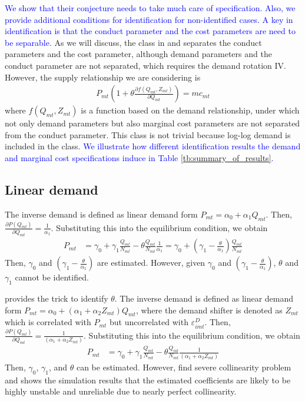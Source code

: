 \documentclass[11pt]{article}
\begin{document}
\textcolor{blue}{We show that their conjecture needs to take much care of specification. Also, we provide additional conditions for identification for non-identified cases.
A key in identification is that the conduct parameter and the cost parameters are need to be separable.}
As we will discuss, the class in \citet{bresnahan1982oligopoly} and \citet{lau1982identifying} separates the conduct parameters and the cost parameter, although demand parameters and the conduct parameter are not separated, which requires the demand rotation IV.
However, the supply relationship we are considering is
\begin{align}
    P_{mt} \left( 1 + \theta\frac{\partial f(Q_{mt}, Z_{mt})}{\partial Q_{mt}}\right) = mc_{mt} \label{eq:supply_in_our_class}
\end{align}
where $f(Q_{mt},Z_{mt})$ is a function based on the demand relationship, under which not only demand parameters but also marginal cost parameters are not separated from the conduct parameter.
This class is not trivial because log-log demand is included in the class.
\textcolor{blue}{We illustrate how different identification results the demand and marginal cost specifications induce in Table \ref{tb:summary_of_results}. }


\subsection{Linear demand}
The inverse demand is defined as linear demand form $P_{mt}=\alpha_0+\alpha_1 Q_{mt}$. Then, $\frac{\partial P\left(Q_{m t}\right)}{\partial Q_{mt}}=\frac{1}{\alpha_1}$. Substituting this into the equilibrium condition, we obtain
\begin{align*}
    P_{m t}&=\gamma_0+\gamma_1 \frac{Q_{mt}}{N_{mt}}-\theta \frac{Q_{mt}}{N_{mt}}\frac{1}{\alpha_1}=\gamma_0+(\gamma_1-\frac{\theta}{\alpha_1}) \frac{Q_{mt}}{N_{mt}}
\end{align*}
Then, $\gamma_0$ and $(\gamma_1-\frac{\theta}{\alpha_1})$ are estimated. However, given $\gamma_0$ and $(\gamma_1-\frac{\theta}{\alpha_1})$, $\theta$ and $\gamma_1$ cannot be identified.

\cite{bresnahan1982oligopoly} provides the trick to identify $\theta$. The inverse demand is defined as linear demand form $P_{mt}=\alpha_0+(\alpha_1+\alpha_2 Z_{mt}) Q_{mt}$, where the demand shifter is denoted as $Z_{mt}$ which is correlated with $P_{mt}$ but uncorrelated with $\varepsilon_{imt}^D$. Then, $\frac{\partial P\left(Q_{m t}\right)}{\partial Q_{mt}}=\frac{1}{(\alpha_1+\alpha_2 Z_{mt})}$. Substituting this into the equilibrium condition, we obtain
\begin{align*}
    P_{m t}&=\gamma_0+\gamma_1 \frac{Q_{mt}}{N_{mt}}-\theta \frac{Q_{mt}}{N_{mt}}\frac{1}{(\alpha_1+\alpha_2 Z_{mt})}
\end{align*}
Then, $\gamma_0$, $\gamma_1$, and $\theta$ can be estimated. However,  \cite{perloff2012collinearity} find severe collinearity problem and shows the simulation results that the estimated coefficients are likely to be highly unstable and unreliable due to nearly perfect collinearity.
\end{document}
